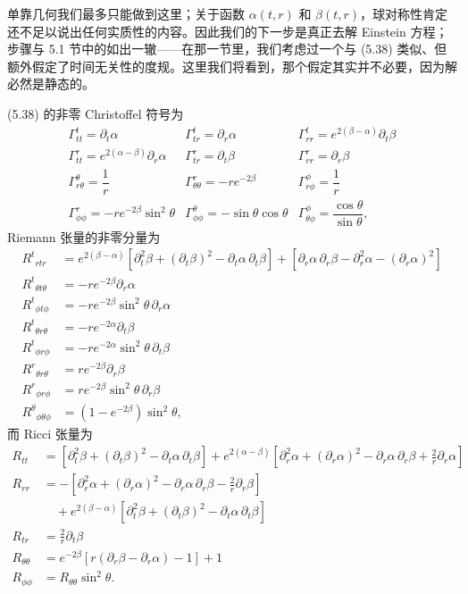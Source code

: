 单靠几何我们最多只能做到这里；关于函数 $\alpha(t, r)$ 和 $\beta(t, r)$，球对称性肯定还不足以说出任何实质性的内容。因此我们的下一步是真正去解 Einstein 方程；步骤与
5.1 节中的如出一辙——在那一节里，我们考虑过一个与 (5.38) 类似、但额外假定了时间无关性的度规。这里我们将看到，那个假定其实并不必要，因为解必然是静态的。

(5.38) 的非零 Christoffel 符号为
\begin{equation*}
\begin{array}{lll}
\Gamma^t_{tt} = \partial_t\alpha & \Gamma^t_{tr} = \partial_r\alpha & \Gamma^t_{rr} = e^{2(\beta-\alpha)}\partial_t\beta\\[8pt]
\Gamma^r_{tt} = e^{2(\alpha-\beta)}\partial_r\alpha & \Gamma^r_{tr} = \partial_t\beta & \Gamma^r_{rr} = \partial_r\beta\\[8pt]
\Gamma^\theta_{r\theta} = \dfrac{1}{r} & \Gamma^r_{\theta\theta} = -re^{-2\beta} & \Gamma^\phi_{r\phi} = \dfrac{1}{r}\\[8pt]
\Gamma^r_{\phi\phi} = -re^{-2\beta}\sin^2\theta & \Gamma^\theta_{\phi\phi} = -\sin\theta\cos\theta & \Gamma^\phi_{\theta\phi} = \dfrac{\cos\theta}{\sin\theta},
\end{array}
\tag{5.39}
\end{equation*}
Riemann 张量的非零分量为
\begin{align*}
R^t{}_{rtr} &= e^{2(\beta-\alpha)}\left[\partial_t^2\beta + (\partial_t\beta)^2 - \partial_t\alpha\,\partial_t\beta\right] + \left[\partial_r\alpha\,\partial_r\beta - \partial_r^2\alpha - (\partial_r\alpha)^2\right]\\
R^t{}_{\theta t\theta} &= -re^{-2\beta}\partial_r\alpha\\
R^t{}_{\phi t\phi} &= -re^{-2\beta}\sin^2\theta\,\partial_r\alpha\\
R^t{}_{\theta r\theta} &= -re^{-2\alpha}\partial_t\beta\\
R^t{}_{\phi r\phi} &= -re^{-2\alpha}\sin^2\theta\,\partial_t\beta\\
R^r{}_{\theta r\theta} &= re^{-2\beta}\partial_r\beta\\
R^r{}_{\phi r\phi} &= re^{-2\beta}\sin^2\theta\,\partial_r\beta\\
R^\theta{}_{\phi\theta\phi} &= (1 - e^{-2\beta})\sin^2\theta,
\tag{5.40}
\end{align*}
而 Ricci 张量为
\begin{align*}
R_{tt} &= \left[\partial_t^2\beta + (\partial_t\beta)^2 - \partial_t\alpha\,\partial_t\beta\right] + e^{2(\alpha-\beta)}\left[\partial_r^2\alpha + (\partial_r\alpha)^2 - \partial_r\alpha\,\partial_r\beta + \frac{2}{r}\partial_r\alpha\right]\\
R_{rr} &= -\left[\partial_r^2\alpha + (\partial_r\alpha)^2 - \partial_r\alpha\,\partial_r\beta - \frac{2}{r}\partial_r\beta\right]\\
&\quad + e^{2(\beta-\alpha)}\left[\partial_t^2\beta + (\partial_t\beta)^2 - \partial_t\alpha\,\partial_t\beta\right]\\
R_{tr} &= \frac{2}{r}\partial_t\beta\\
R_{\theta\theta} &= e^{-2\beta}\left[r(\partial_r\beta - \partial_r\alpha) - 1\right] + 1\\
R_{\phi\phi} &= R_{\theta\theta}\sin^2\theta.
\tag{5.41}
\end{align*}
